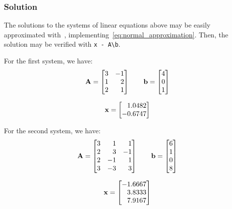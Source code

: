 \subsubsection*{Solution}
The solutions to the systems of linear equations above may be easily approximated
with~, implementing~\eqref{eq:normal_approximation}.
Then, the solution may be verified with \lstinline[style=Matlab-editor]{x - A\b}.

For the first system, we have:
\begin{equation*}
  \mathbf{A} = \begin{bmatrix}
    3 & -1 \\
    1 & \phantom{-}2 \\
    2 & \phantom{-}1
  \end{bmatrix} \qquad
  \mathbf{b} = \begin{bmatrix}
    4 \\
    0 \\
    1
  \end{bmatrix}
\end{equation*}

\begin{equation*}
  \mathbf{x} = \begin{bmatrix}
    \phantom{-}1.0482 \\
    -0.6747
  \end{bmatrix}
\end{equation*}

For the second system, we have:
\begin{equation*}
  \mathbf{A} = \begin{bmatrix}
    3 & \phantom{-}1 & \phantom{-}1 \\
    2 & \phantom{-}3 & -1 \\
    2 & -1 & \phantom{-}1 \\
    3 & -3 & \phantom{-}3
  \end{bmatrix} \qquad
  \mathbf{b} = \begin{bmatrix}
    6 \\
    1 \\
    0 \\
    8
  \end{bmatrix}
\end{equation*}

\begin{equation*}
  \mathbf{x} = \begin{bmatrix}
    -1.6667 \\
    \phantom{-}3.8333 \\
    \phantom{-}7.9167
  \end{bmatrix}
\end{equation*}

